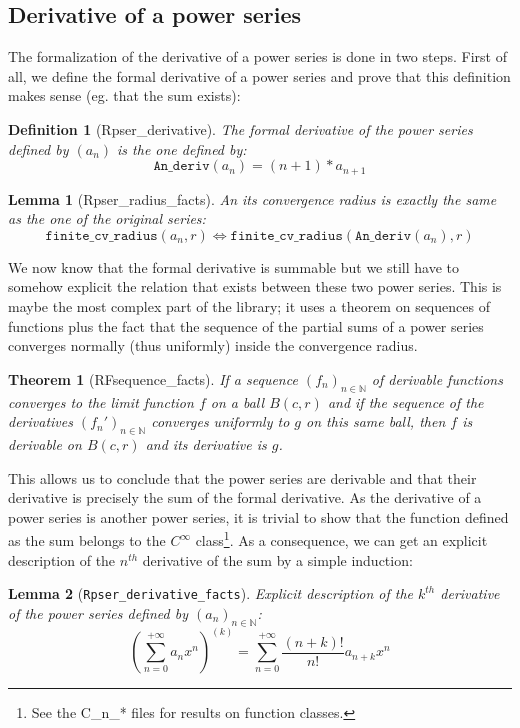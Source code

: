 \documentclass[submission,copyright]{eptcs}
\newcommand{\N}{\mathbb{N}}
\newcommand{\D}{\texttt{An\_deriv}}
\newcommand{\fcvr}{\texttt{finite\_cv\_radius}}
\newtheorem{definition}{Definition}
\newtheorem{lemma}{Lemma}
\newtheorem{theorem}{Theorem}
\begin{document}
\subsection{Derivative of a power series}

The formalization of the derivative of a power series is done in two steps.
First of all, we define the formal derivative of a power series and prove
that this definition makes sense (eg. that the sum exists):

\begin{definition}[Rpser\_derivative] The formal derivative of the power
series defined by $(a_n)$ is the one defined by:
$$\D{}(a_n) = (n + 1) * a_{n+1}$$
\end{definition}

\begin{lemma}[Rpser\_radius\_facts] An its convergence radius is exactly
the same as the one of the original series: $$\fcvr{}(a_n,r) \Leftrightarrow
\fcvr{}(\D{}(a_n),r)$$\end{lemma}

We now know that the formal derivative is summable but we still have to
somehow explicit the relation that exists between these two power series.
This is maybe the most complex part of the library; it uses a theorem on
sequences of functions plus the fact that the sequence of the partial
sums of a power series converges normally (thus uniformly) inside the
convergence radius.

\begin{theorem}[RFsequence\_facts] If a sequence $(f_n)_{n \in \N}$ of
derivable functions converges to the limit function $f$ on a ball $B(c,r)$
and if the sequence of the derivatives $(f_n')_{n \in \N}$ converges
uniformly to $g$ on this same ball, then $f$ is derivable on $B(c,r)$ and
its derivative is $g$.\end{theorem}

This allows us to conclude that the power series are derivable and that
their derivative is precisely the sum of the formal derivative.
As the derivative of a power series is another power series, it is
trivial to show that the function defined as the sum belongs to the
$C^{\infty}$ class\footnote{See the C\_n\_* files for results on
function classes.}. As a consequence, we can get an explicit description
of the $n^{th}$ derivative of the sum by a simple induction:

\begin{lemma}[\texttt{Rpser\_derivative\_facts}] Explicit description of the
$k^{th}$ derivative of the power series defined by $(a_n)_{n\in \N}$:
$$(\sum_{n=0}^{+\infty} a_n x^n)^{(k)} = \sum_{n=0}^{+\infty}
\frac{(n + k)!}{n!} a_{n+k} x^n$$
\end{lemma}
\end{document}
